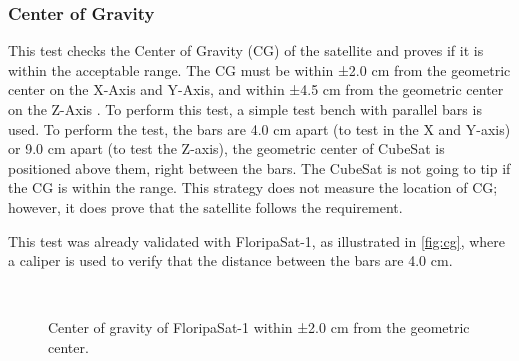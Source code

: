 \subsubsection{Center of Gravity}

This test checks the Center of Gravity (CG) of the satellite and proves if it is within the acceptable range. The CG must be within ±2.0 cm from the geometric center on the X-Axis and Y-Axis, and within ±4.5 cm from the geometric center on the Z-Axis \cite{cds}. To perform this test, a simple test bench with parallel bars is used. To perform the test, the bars are 4.0 cm apart (to test in the X and Y-axis) or 9.0 cm apart (to test the Z-axis), the geometric center of CubeSat is positioned above them, right between the bars. The CubeSat is not going to tip if the CG is within the range. This strategy does not measure the location of CG; however, it does prove that the satellite follows the requirement.

This test was already validated with FloripaSat-1, as illustrated in \autoref{fig:cg}, where a caliper is used to verify that the distance between the bars are 4.0 cm.

\begin{figure}[!htb]
    \begin{center}
        ~
        ~
        \caption{Center of gravity of FloripaSat-1 within ±2.0 cm from the geometric center.}
        \label{fig:cg}
    \end{center}
\end{figure}


